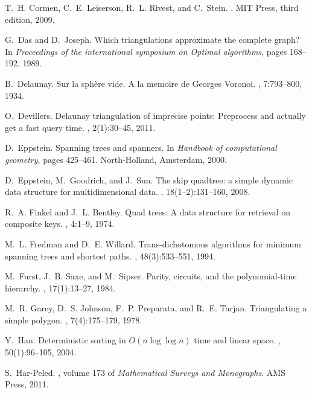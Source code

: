 \documentclass[11pt]{paper}
\begin{document}
\begin{thebibliography}{10}
T.~H. Cormen, C.~E. Leiserson, R.~L. Rivest, and C.~Stein.
.
\newblock MIT Press, third edition, 2009.

G.~Das and D.~Joseph.
\newblock Which triangulations approximate the complete graph?
\newblock In {\em Proceedings of the international symposium on Optimal
  algorithms}, pages 168--192, 1989.

B.~Delaunay.
\newblock Sur la sph{\`e}re vide. {A} la memoire de {Georges} {Voronoi}.
, 7:793--800, 1934.

O.~Devillers.
\newblock Delaunay triangulation of imprecise points: Preprocess and actually
  get a fast query time.
, 2(1):30--45, 2011.

D.~Eppstein.
\newblock Spanning trees and spanners.
\newblock In {\em Handbook of computational geometry}, pages 425--461.
  North-Holland, Amsterdam, 2000.

D.~Eppstein, M.~Goodrich, and J.~Sun.
\newblock The skip quadtree: a simple dynamic data structure for
  multidimensional data.
, 18(1--2):131--160, 2008.

R.~A. Finkel and J.~L. Bentley.
\newblock Quad trees: A data structure for retrieval on composite keys.
, 4:1--9, 1974.

M.~L. Fredman and D.~E. Willard.
\newblock Trans-dichotomous algorithms for minimum spanning trees and shortest
  paths.
, 48(3):533--551, 1994.

M.~Furst, J.~B. Saxe, and M.~Sipser.
\newblock Parity, circuits, and the polynomial-time hierarchy.
, 17(1):13--27, 1984.

M.~R. Garey, D.~S. Johnson, F.~P. Preparata, and R.~E. Tarjan.
\newblock Triangulating a simple polygon.
, 7(4):175--179, 1978.

Y.~Han.
\newblock Deterministic sorting in {$O(n\log \log n)$} time and linear space.
, 50(1):96--105, 2004.

S.~Har-Peled.
, volume 173 of {\em
  Mathematical Surveys and Monographs}.
\newblock AMS Press, 2011.


\end{thebibliography}
\end{document}

